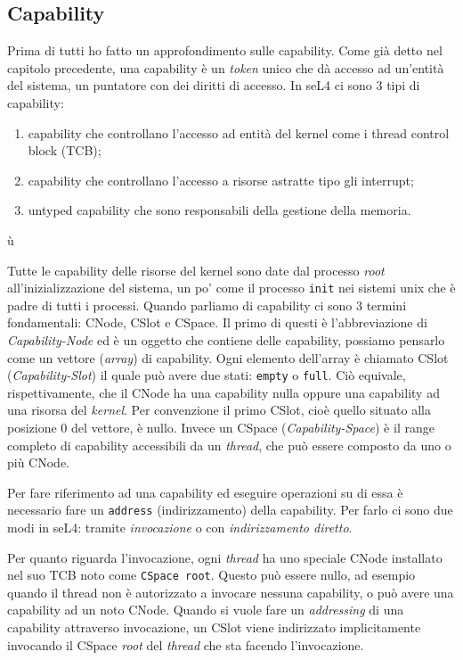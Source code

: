 \subsection{Capability}
Prima di tutti ho fatto un approfondimento sulle capability. Come già detto nel capitolo precedente, una capability è un \textit{token} unico che dà accesso ad un'entità del sistema, un puntatore con dei diritti di accesso. In seL4 ci sono 3 tipi di capability:
\begin{enumerate}
	\item capability che controllano l'accesso ad entità del kernel come i thread control block (TCB);
	\item capability che controllano l'accesso a risorse astratte tipo gli interrupt;
	\item untyped capability che sono responsabili della gestione della memoria.
\end{enumerate}ù

Tutte le capability delle risorse del kernel sono date dal processo \textit{root} all'inizializzazione del sistema, un po' come il processo \texttt{init} nei sistemi unix che è padre di tutti i processi. Quando parliamo di capability ci sono 3 termini fondamentali: CNode, CSlot e CSpace. Il primo di questi è l'abbreviazione di \textit{Capability-Node} ed è un oggetto che contiene delle capability, possiamo pensarlo come un vettore (\textit{array}) di capability. Ogni elemento dell'array è chiamato CSlot (\textit{Capability-Slot}) il quale può avere due stati: \texttt{empty} o \texttt{full}. Ciò equivale, rispettivamente, che il CNode ha una capability nulla oppure una capability ad una risorsa del \textit{kernel}. Per convenzione il primo CSlot, cioè quello situato alla posizione 0 del vettore, è nullo. Invece un CSpace (\textit{Capability-Space}) è il range completo di capability accessibili da un \textit{thread}, che può essere composto da uno o più CNode.

Per fare riferimento ad una capability ed eseguire operazioni su di essa è necessario fare un \texttt{address} (indirizzamento) della capability. Per farlo ci sono due modi in seL4: tramite \textit{invocazione} o con \textit{indirizzamento diretto}.

Per quanto riguarda l'invocazione, ogni \textit{thread} ha uno speciale CNode installato nel suo TCB noto come \texttt{CSpace root}. Questo può essere nullo, ad esempio quando il thread non è autorizzato a invocare nessuna capability, o può avere una capability ad un noto CNode. Quando si vuole fare un \textit{addressing} di una capability attraverso invocazione, un CSlot viene indirizzato implicitamente invocando il CSpace \textit{root} del \textit{thread} che sta facendo l'invocazione.


